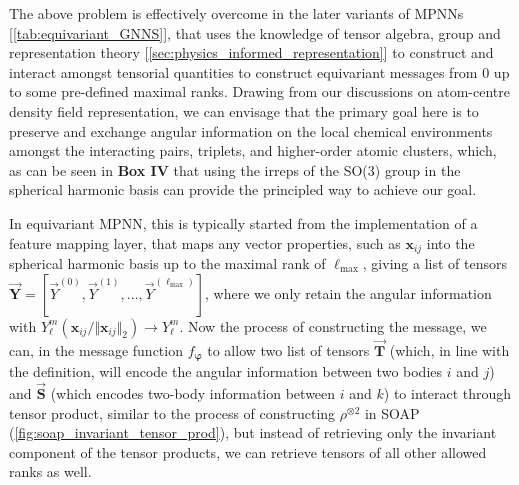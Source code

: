 The above problem is effectively overcome in the later variants of MPNNs [\cref{tab:equivariant_GNNS}], that uses the knowledge of tensor algebra, group and representation theory [\cref{sec:physics_informed_representation}] to construct and interact amongst tensorial quantities to construct equivariant messages from 0 up to some pre-defined maximal ranks. Drawing from our discussions on atom-centre density field representation, we can envisage that the primary goal here is to preserve and exchange angular information on the local chemical environments amongst the interacting pairs, triplets, and higher-order atomic clusters, which, as can be seen in \textbf{Box IV} that using the irreps of the SO(3) group in the spherical harmonic basis can provide the principled way to achieve our goal. 

In equivariant MPNN, this is typically started from the implementation of a feature mapping layer, that maps any vector properties, such as $\bm{x}_{ij}$ into the spherical harmonic basis up to the maximal rank of $\ell_{\max}$, giving a list of tensors $\vec{\bm{Y}}=[\vec{Y}^{(0)},\vec{Y}^{(1)},\ldots,\vec{Y}^{(\ell_{\max})}]$, where we only retain the angular information with $Y_\ell^m(\bm{x}_{ij}/\Vert \bm{x}_{ij}\Vert_2)\to Y_\ell^m$. Now the process of constructing the message, we can, in the message function $f_{\boldsymbol{\varphi}}$ to allow two list of tensors $\vec{\bm{T}}$ (which, in line with the definition, will encode the angular information between two bodies $i$ and $j$) and $\vec{\bm{S}}$ (which encodes two-body information between $i$ and $k$) to interact through tensor product, similar to the process of constructing $\rho^{\otimes 2}$ in SOAP (\cref{fig:soap_invariant_tensor_prod}), but instead of retrieving only the invariant component of the tensor products, we can retrieve tensors of all other allowed ranks as well. 


